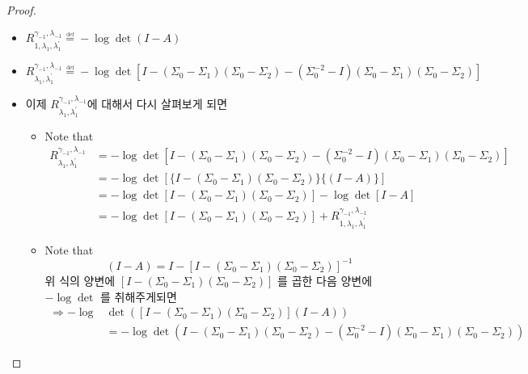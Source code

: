 \begin{proof}
\begin{itemize}
\begin{itemize}
    \item ${R^{\gamma_{-1},\lambda_{-1}}_{1,\lambda_1,\lambda_1^'}} \overset{\underset{\mathrm{def}}{}}{=} -\log\det(I-A)$
    
    \item ${R^{\gamma_{-1},\lambda_{-1}}_{\lambda_1,\lambda_1^'}} \overset{\underset{\mathrm{def}}{}}{=}
    -\log\det[I-(\Sigma_0 -\Sigma_1)(\Sigma_0 -\Sigma_2)-(\Sigma_{0}^{-2}-I)(\Sigma_0 -\Sigma_1)(\Sigma_0 -\Sigma_2)]$
    

    
    \end{itemize}

\end{itemize}

    \vspace{15mm}

\begin{itemize}
    \item 이제 ${R^{\gamma_{-1},\lambda_{-1}}_{\lambda_1,\lambda_1^'}}$에 대해서 다시 살펴보게 되면
    
    
\begin{itemize}
    
    \item Note that
    $$\begin{aligned}
    {R^{\gamma_{-1},\lambda_{-1}}_{\lambda_1,\lambda_1^'}} 
    & = -\log\det[I-(\Sigma_0 -\Sigma_1)(\Sigma_0 -\Sigma_2)-(\Sigma_{0}^{-2}-I)(\Sigma_0 -\Sigma_1)(\Sigma_0 -\Sigma_2)]\\
    & = -\log\det[\{I-(\Sigma_0 -\Sigma_1)(\Sigma_0 -\Sigma_2)\}\{(I-A)\}]\\
    & = -\log\det[I-(\Sigma_0 -\Sigma_1)(\Sigma_0 -\Sigma_2)]-\log\det[I-A]\\
    & = -\log\det[I-(\Sigma_0 -\Sigma_1)(\Sigma_0 -\Sigma_2)]+{R^{\gamma_{-1},\lambda_{-1}}_{1,\lambda_1,\lambda_1^'}}
    \end{aligned}$$
    
    
    
    
    \item Note that $$(I-A)=I-[I-(\Sigma_{0}-\Sigma_{1})(\Sigma_{0}-\Sigma_{2})]^{-1}$$
    위 식의 양변에 $[I-(\Sigma_{0}-\Sigma_{1})(\Sigma_{0}-\Sigma_{2})]$ 를 곱한 다음 양변에 $-\log\det$ 를 취해주게되면
    $$\begin{aligned}
        \Rightarrow -\log & \det ([I-(\Sigma_{0}-\Sigma_{1})(\Sigma_{0}-\Sigma_{2})](I-A))\\
        &=-\log\det(I-(\Sigma_{0}-\Sigma_{1})(\Sigma_{0}-\Sigma_{2})-(\Sigma_{0}^{-2} - I)(\Sigma_0 -\Sigma_1)(\Sigma_0 -\Sigma_2))
    \end{aligned}$$
    

\end{itemize}
\end{itemize}
\end{proof}
